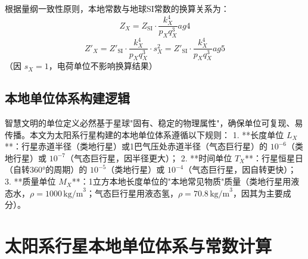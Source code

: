 \documentclass[a4paper, 12pt]{article}
\begin{document}
根据量纲一致性原则，本地常数与地球SI常数的换算关系为：
\begin{equation}
Z_X = Z_{\text{SI}} \cdot \frac{k_X^4}{p_X q_X^3} 	ag{4}
\end{equation}
\begin{equation}
Z'_X = Z'_{\text{SI}} \cdot \frac{k_X^4}{p_X q_X^3} \cdot s_X^2 = Z'_{\text{SI}} \cdot \frac{k_X^4}{p_X q_X^3} 	ag{5}
\end{equation}
（因 $s_X = 1$，电荷单位不影响换算结果）

\subsection{本地单位体系构建逻辑}
智慧文明的单位定义必然基于星球"固有、稳定的物理属性"，确保单位可复现、易传播\cite{liu2008threebody}。本文为太阳系行星构建的本地单位体系遵循以下规则：
1. **长度单位 $L_X$**：行星赤道半径（类地行星）或1巴气压处赤道半径（气态巨行星）的 $10^{-6}$（类地行星）或 $10^{-7}$（气态巨行星，因半径更大）；
2. **时间单位 $T_X$**：行星恒星日（自转360°的周期）的 $10^{-5}$（类地行星）或 $10^{-4}$（气态巨行星，因自转更快）；
3. **质量单位 $M_X$**：1立方本地长度单位的"本地常见物质"质量（类地行星用液态水，$\rho = 1000 \, \text{kg/m}^3$；气态巨行星用液态氢，$\rho = 70.8 \, \text{kg/m}^3$，因其为主要成分）。

\section{太阳系行星本地单位体系与常数计算}
\end{document}
